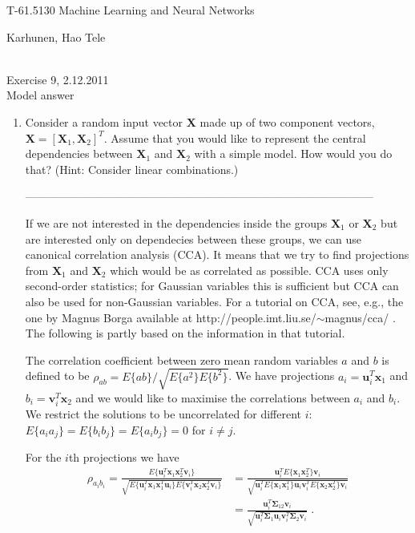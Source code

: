 \documentclass[10pt]{article}
\renewcommand{\vec}[1]{\mathbf{#1}}
\renewcommand{\u}{\vec{u}}
\renewcommand{\v}{\vec{v}}
\newcommand{\x}{\vec{x}}
\begin{document}
\pagestyle{empty}
\begin{Large}
\begin{bf} 
T-61.5130 Machine Learning and Neural Networks\\ 
\end{bf}
\end{Large}
Karhunen, Hao Tele\\
\\
\begin{large}
\begin{bf}
Exercise 9,  2.12.2011\\Model answer
\end{bf}
\end{large}
\begin{enumerate}

\item Consider a random input vector $\mathbf{X}$ made up of two component vectors,
 $\mathbf{X} = [\mathbf{X}_1,\mathbf{X}_2]^T$. Assume that you would like to represent the
 central dependencies between $\mathbf{X}_1$ and $\mathbf{X}_2$ with a  simple
 model. How would you do that? (Hint: Consider linear combinations.)

---------------------------------------------------------------------------------------------

 If we are not interested in the dependencies inside the groups
  $\vec{X}_1$ or $\vec{X}_2$ but are interested only on dependecies
  between these groups, we can use canonical correlation analysis (CCA).  It
  means that we try to find projections from $\vec{X}_1$ and
  $\vec{X}_2$ which would be as correlated as possible. CCA uses only
  second-order statistics; for Gaussian variables this
  is sufficient but CCA can also be used for
  non-Gaussian variables. For a tutorial on CCA, see,
  e.g., the one by Magnus Borga available
  at http://people.imt.liu.se/$\sim$magnus/cca/ . The following is
  partly based on the information in that tutorial.

  The correlation coefficient between zero mean random variables $a$
  and $b$ is defined to be $\rho_{ab} =
  E\{ab\}/\sqrt{E\{a^2\}E\{b^2\}}$.  We have projections $a_i = \u_i^T
  \x_1$ and $b_i = \v_i^T \x_2$ and we would like to maximise the
  correlations between $a_i$ and $b_i$. We restrict the solutions to be
  uncorrelated for different $i$: $E\{a_i a_j\} = E\{b_i b_j\} = E\{a_i b_j\} = 0$
  for $i \neq j$.

  For the $i$th projections we have
  \begin{align*}\nonumber
  \rho_{a_i b_i}
  = \frac{E\{\u_i^T \x_1 \x_2^T \v_i\}}{\sqrt{E\{\u_i^T \x_1\x_1^T\u_i\} E\{\v_i^T \x_2\x_2^T\v_i\}}}
  &= \frac{\u_i^T E\{\x_1 \x_2^T\} \v_i}{\sqrt{\u_i^T E\{\x_1\x_1^T\}\u_i \v_i^T E\{\x_2\x_2^T\}\v_i}} \\
  &= \frac{\u_i^T \boldsymbol{\Sigma}_{12} \v_i}{\sqrt{\u_i^T \boldsymbol{\Sigma}_1\u_i \v_i^T \boldsymbol{\Sigma}_2\v_i}} \;.
  \end{align*}


\end{enumerate}
\end{document}
